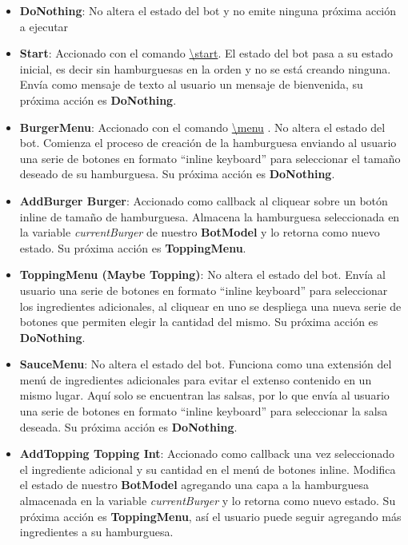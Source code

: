\documentclass[a4paper,12pt]{article}
\begin{document}
\begin{itemize}
	\item 
	\textbf{DoNothing}: No altera el estado del bot y no emite ninguna próxima acción a ejecutar
	
	\item
	\textbf{Start}: Accionado con el comando 
	\color{blue}\uline{\textbackslash start}\color{black}. 
	El estado del bot pasa a su estado inicial, es decir sin hamburguesas en la orden y no se está creando ninguna. Envía como mensaje de texto al usuario un mensaje de bienvenida, su próxima acción es \textbf{DoNothing}.
	
	\item
	\textbf{BurgerMenu}: Accionado con el comando 
	\color{blue}\uline{\textbackslash menu}\color{black}
	. No altera el estado del bot. Comienza el proceso de creación de la hamburguesa enviando al usuario una serie de botones en formato “inline keyboard” para seleccionar el tamaño deseado de su hamburguesa. Su próxima acción es \textbf{DoNothing}.
	
	\item
	\textbf{AddBurger  \color{blue}Burger\color{black}}: Accionado como callback al cliquear sobre un botón inline de tamaño de hamburguesa. Almacena la hamburguesa seleccionada en la variable \textit{currentBurger} de nuestro \textbf{BotModel} y lo retorna como nuevo estado.  Su próxima acción es \textbf{ToppingMenu}.
	
	\item
	\textbf{ToppingMenu \color{blue}(Maybe Topping)\color{black}}: No altera el estado del bot. Envía al usuario una serie de botones en formato “inline keyboard” para seleccionar los ingredientes adicionales, al cliquear en uno se despliega una nueva serie de botones que permiten elegir la cantidad del mismo. Su próxima acción es \textbf{DoNothing}.
	
	\item
	\textbf{SauceMenu}: No altera el estado del bot. Funciona como una extensión del menú de ingredientes adicionales para evitar el extenso contenido en un mismo lugar. Aquí solo se encuentran las salsas, por lo que envía al usuario una serie de botones en formato “inline keyboard” para seleccionar la salsa deseada. Su próxima acción es \textbf{DoNothing}.
	
	\item
	\textbf{AddTopping \color{blue}Topping Int\color{black}}: Accionado como callback una vez seleccionado el ingrediente adicional y su cantidad en el menú de botones inline. Modifica el estado de nuestro \textbf{BotModel} agregando una capa a la hamburguesa almacenada en la variable \textit{currentBurger} y lo retorna como nuevo estado. Su próxima acción es \textbf{ToppingMenu}, así el usuario puede seguir agregando más ingredientes a su hamburguesa.
	

\end{itemize}
\end{document}
